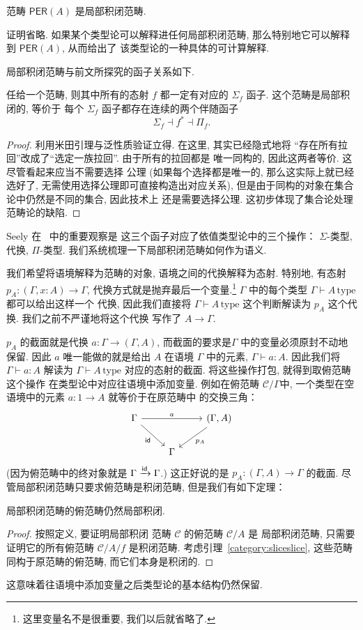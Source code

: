 \begin{theorem}
范畴 \(\mathsf{PER}(A)\) 是局部积闭范畴.
\end{theorem}
证明省略. 如果某个类型论可以解释进任何局部积闭范畴,
那么特别地它可以解释到 \(\mathsf{PER}(A)\), 从而给出了
该类型论的一种具体的可计算解释.

局部积闭范畴与前文所探究的函子关系如下.
\begin{theorem}
任给一个范畴, 则其中所有的态射 \(f\) 都一定有对应的
\(\Sigma_f\) 函子. 这个范畴是局部积闭的, 等价于
每个 \(\Sigma_f\) 函子都存在连续的两个伴随函子
\[\Sigma_f\dashv f^*\dashv \Pi_f.\]
\end{theorem}
\begin{proof}
利用米田引理与泛性质验证立得. 在这里, 其实已经隐式地将
“存在所有拉回”改成了“选定一族拉回”. 由于所有的拉回都是
唯一同构的, 因此这两者等价. 这尽管看起来应当不需要选择
公理 (如果每个选择都是唯一的, 那么这实际上就已经选好了,
无需使用选择公理即可直接构造出对应关系),
但是由于同构的对象在集合论中仍然是不同的集合, 因此技术上
还是需要选择公理. 这初步体现了集合论处理范畴论的缺陷.
\end{proof}
Seely 在 \cite{seely:1984:lccc}~中的重要观察是
这三个函子对应了依值类型论中的三个操作：
\(\Sigma\)-类型, 代换, \(\Pi\)-类型.
我们系统梳理一下局部积闭范畴如何作为语义.

我们希望将语境解释为范畴的对象, 语境之间的代换解释为态射.
特别地, 有态射 \(p_A : (\Gamma, x{:}A) \to \Gamma\),
代换方式就是抛弃最后一个变量.\footnote{这里变量名不是很重要,
我们以后就省略了.} \(\Gamma\) 中的每个类型
\(\Gamma \vdash A\,\text{type}\) 都可以给出这样一个
代换, 因此我们直接将 \(\Gamma \vdash A\,\text{type}\)
这个判断解读为 \(p_A\) 这个代换. 我们之前不严谨地将这个代换
写作了 \(A \to \Gamma\).

\(p_A\) 的截面就是代换 \(a : \Gamma \to (\Gamma, A)\),
而截面的要求是\(\Gamma\) 中的变量必须原封不动地保留.
因此 \(a\) 唯一能做的就是给出 \(A\) 在语境 \(\Gamma\)
中的元素, \(\Gamma \vdash a : A\). 因此我们将
\(\Gamma \vdash a : A\) 解读为 \(\Gamma \vdash A\,\text{type}\)
对应的态射的截面. 将这些操作打包, 就得到取俯范畴这个操作
在类型论中对应往语境中添加变量. 例如在俯范畴 \(\mathcal C/\Gamma\)中,
一个类型在空语境中的元素 \(a : 1 \to A\) 就等价于在原范畴中
的交换三角：
\[\begin{tikzcd}
  \Gamma && {(\Gamma, A)} \\
  & \Gamma
  \arrow["{\cons{id}}"', from=1-1, to=2-2]
  \arrow["{p_A}", from=1-3, to=2-2]
  \arrow["a", from=1-1, to=1-3]
\end{tikzcd}\]
(因为俯范畴中的终对象就是 \(\Gamma \xrightarrow{\textnormal{\textsf{id}}} \Gamma\).)
这正好说的是 \(p_A : (\Gamma, A) \to \Gamma\) 的截面.
尽管局部积闭范畴只要求俯范畴是积闭范畴, 但是我们有如下定理：
\begin{theorem}\label{category:lccc:slice}
  局部积闭范畴的俯范畴仍然局部积闭.
\end{theorem}
\begin{proof}
按照定义, 要证明局部积闭
范畴 \(\mathcal C\) 的俯范畴 \(\mathcal C/A\) 是
局部积闭范畴, 只需要证明它的所有俯范畴 \(\mathcal C/A/f\)
是积闭范畴. 考虑引理~\ref{category:sliceslice},
这些范畴同构于原范畴的俯范畴, 而它们本身是积闭的.
\end{proof}
这意味着往语境中添加变量之后类型论的基本结构仍然保留.

